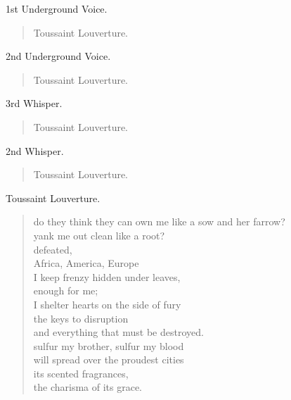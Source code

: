\documentclass[letterpaper,article,12pt,oneside,notitlepage]{memoir}
\begin{document}
\begin{center}1st Underground Voice.\end{center}

\begin{verse}
\hspace{1cm} Toussaint Louverture. \\
\end{verse}

\begin{center}2nd Underground Voice.\end{center}

\begin{verse}
\hspace{1cm} Toussaint Louverture. \\
\end{verse}

\begin{center}3rd Whisper.\end{center}

\begin{verse}
\hspace{1cm} Toussaint Louverture. \\
\end{verse}

\begin{center}2nd Whisper.\end{center}

\begin{verse}
\hspace{1cm} Toussaint Louverture. \\
\end{verse}

\begin{center}Toussaint Louverture.\end{center}

\begin{verse}
do they think they can own me like a sow and her farrow? \\
yank me out clean like a root? \\
defeated, \\
Africa, America, Europe \\
I keep frenzy hidden under leaves, \\
enough for me; \\
I shelter hearts on the side of fury \\
the keys to disruption \\
and everything that must be destroyed. \\
sulfur my brother, sulfur my blood \\
will spread over the proudest cities \\
its scented fragrances, \\
the charisma of its grace. \\
\end{verse}
\end{document}
